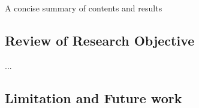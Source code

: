 A concise summary of contents and results

\subsection{Review of Research Objective}
\label{subsec:review}
...

\subsection{Limitation and Future work}
\label{subsec:future}